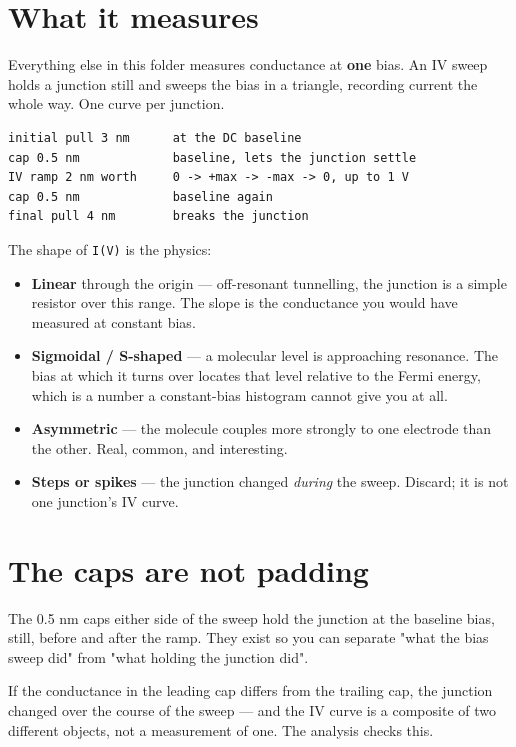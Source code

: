 \section{What it measures}

Everything else in this folder measures conductance at \textbf{one} bias. An IV sweep holds a junction still and sweeps the bias in a triangle, recording current the whole way. One curve per junction.

\begin{lstlisting}[style=out]
initial pull 3 nm      at the DC baseline
cap 0.5 nm             baseline, lets the junction settle
IV ramp 2 nm worth     0 -> +max -> -max -> 0, up to 1 V
cap 0.5 nm             baseline again
final pull 4 nm        breaks the junction
\end{lstlisting}

The shape of \texttt{I(V)} is the physics:

\begin{itemize}[leftmargin=*]
\item \textbf{Linear} through the origin --- off-resonant tunnelling, the junction is a simple resistor over this range. The slope is the conductance you would have measured at constant bias.
\item \textbf{Sigmoidal / S-shaped} --- a molecular level is approaching resonance. The bias at which it turns over locates that level relative to the Fermi energy, which is a number a constant-bias histogram cannot give you at all.
\item \textbf{Asymmetric} --- the molecule couples more strongly to one electrode than the other. Real, common, and interesting.
\item \textbf{Steps or spikes} --- the junction changed \emph{during} the sweep. Discard; it is not one junction's IV curve.
\end{itemize}

\section{The caps are not padding}

The 0.5 nm caps either side of the sweep hold the junction at the baseline bias, still, before and after the ramp. They exist so you can separate "what the bias sweep did" from "what holding the junction did".

If the conductance in the leading cap differs from the trailing cap, the junction changed over the course of the sweep --- and the IV curve is a composite of two different objects, not a measurement of one. The analysis checks this.

